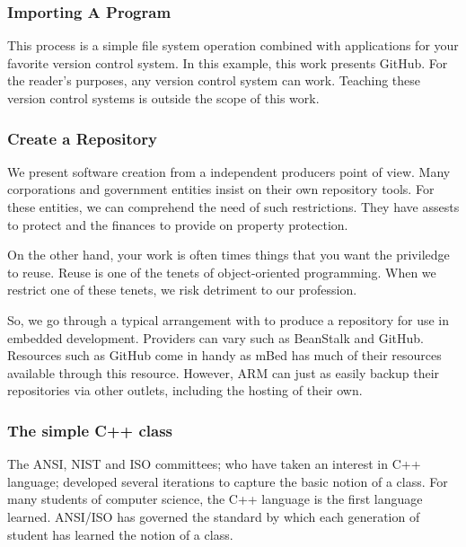 \documentclass{article}
\begin{document}

\subsubsection{Importing A Program} %
\label{ssub:importing_a_program}

This process is a simple file system operation combined with applications for your favorite version control system.  In this example, this work presents GitHub.  For the reader's purposes, any version control system can work.  Teaching these version control systems is outside the scope of this work.



\subsubsection{Create a Repository} %
\label{ssub:create_a_repository}

We present software creation from a independent producers point of view.  Many corporations and government entities insist on their own repository tools.  For these entities, we can comprehend the need of such restrictions.  They have assests to protect and the finances to provide on property protection.  

On the other hand, your work is often times things that you want the priviledge to reuse.  Reuse is one of the tenets of object-oriented programming.  When we restrict one of these tenets, we risk detriment to our profession.  

So, we go through a typical arrangement with to produce a repository for use in embedded development.  Providers can vary such as BeanStalk and GitHub.  Resources such as GitHub come in handy as mBed has much of their resources available through this resource.  However, ARM can just as easily backup their repositories via other outlets, including the hosting of their own. 



\newpage
\subsubsection{The simple C++ class} %
\label{ssub:the_simple_c_class}

The ANSI, NIST and ISO committees; who have taken an interest in C++ language; developed several iterations to capture the basic notion of a class.  For many students of computer science, the C++ language is the first language learned.  ANSI/ISO has governed the standard by which each generation of student has learned the notion of a class.
\end{document}
